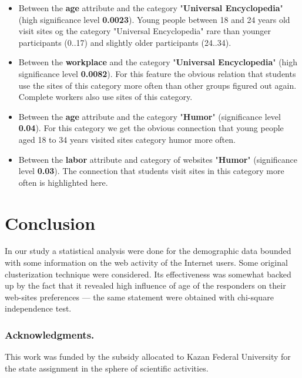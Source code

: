 \documentclass[runningheads,a4paper]{llncs}
\begin{document}
\begin{itemize}
	\item Between the \textbf{age} attribute and the category "\textbf{Universal Encyclopedia}" (high significance level \textbf{0.0023}). Young people between 18 and 24 years old visit sites og the category "Universal Encyclopedia" rare than younger participants (0..17) and slightly older participants (24..34).
	\item Between the \textbf{workplace} and the category "\textbf{Universal Encyclopedia}" (high significance level \textbf{0.0082}). For this feature the obvious relation that students use the sites of this category more often than other groups figured out again. Complete workers also use sites of this category.
	\item Between the \textbf{age} attribute and the category "\textbf{Humor}" (significance level \textbf{0.04}). For this category we get the obvious connection that young people aged 18 to 34 years visited sites category humor more often.
	\item Between the \textbf{labor} attribute and category of websites "\textbf{Humor}" (significance level \textbf{0.03}). The connection that students visit sites in this category more often is highlighted here.
\end{itemize}


\section{Conclusion}

In our study a statistical analysis were done for the demographic data bounded with some information on the web activity of the Internet users. Some original clusterization technique were considered. Its effectiveness was somewhat backed up by the fact that it revealed high influence of age of the responders on their web-sites preferences --- the same statement were obtained with chi-square independence test.


\subsubsection*{Acknowledgments.} This work was funded by the subsidy allocated to Kazan Federal University for the state assignment in the sphere of scientific activities.
\end{document}

